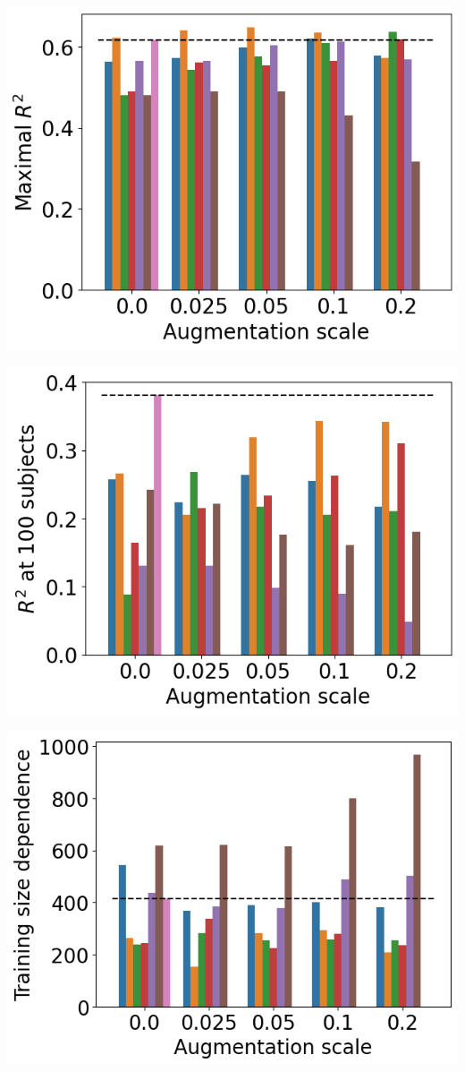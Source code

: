\documentclass[a0paper,landscape,fontscale=0.365]{baposter}
\newenvironment{Figure}
  {\par\medskip\noindent\minipage{\linewidth}}
  {\endminipage\par\medskip}
\begin{document}
\begin{poster}
{\begin{multicols}{3}
    \begin{Figure}
        \centering
        \includegraphics[width=0.9\linewidth]{figures/max_acc}
    \end{Figure}
    \columnbreak
    \begin{Figure}
        \centering
        \includegraphics[width=0.9\linewidth]{figures/min_acc}
    \end{Figure}

    \columnbreak
    \begin{Figure}
        \centering
        \includegraphics[width=0.9\linewidth]{figures/num_subjects}
    \end{Figure}


\end{multicols}}
\end{poster}
\end{document}
